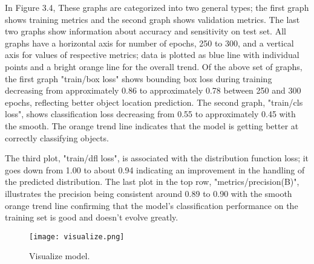 \documentclass[a4paper,13pt]{report}
\begin{document}
In Figure 3.4, These graphs are categorized into two general types; the first graph shows training metrics and the second graph shows validation metrics. The last two graphs show information about accuracy and sensitivity on test set. All graphs have a horizontal axis for number of epochs, 250 to 300, and a vertical axis for values of respective metrics; data is plotted as blue line with individual points and a bright orange line for the overall trend. Of the above set of graphs, the first graph "train/box loss" shows bounding box loss during training decreasing from approximately 0.86 to approximately 0.78 between 250 and 300 epochs, reflecting better object location prediction. The second graph, "train/cls loss", shows classification loss decreasing from 0.55 to approximately 0.45 with the smooth. The orange trend line indicates that the model is getting better at correctly classifying objects.

 The third plot, "train/dfl loss", is associated with the distribution function loss; it goes down from 1.00 to about 0.94 indicating an improvement in the handling of the predicted distribution. The last plot in the top row, "metrics/precision(B)", illustrates the precision being consistent around 0.89 to 0.90 with the smooth orange trend line confirming that the model's classification performance on the training set is good and doesn't evolve
greatly.

\begin{figure}[H]
  \centering
  \texttt{[image: visualize.png]}
  \caption{Visualize model.}
  \label{fig:method}
\end{figure}
\end{document}
